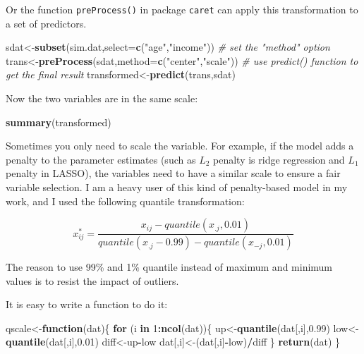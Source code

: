 \documentclass[12pt,]{krantz}
\makeatletter
\newenvironment{Shaded}{\begin{snugshade}}{\end{snugshade}}
\newcommand{\KeywordTok}[1]{\textcolor[rgb]{0.27,0.27,0.27}{\textbf{#1}}}
\newcommand{\DataTypeTok}[1]{\textcolor[rgb]{0.27,0.27,0.27}{#1}}
\newcommand{\DecValTok}[1]{\textcolor[rgb]{0.06,0.06,0.06}{#1}}
\newcommand{\FloatTok}[1]{\textcolor[rgb]{0.06,0.06,0.06}{#1}}
\newcommand{\StringTok}[1]{\textcolor[rgb]{0.5,0.5,0.5}{#1}}
\newcommand{\CommentTok}[1]{\textcolor[rgb]{0.37,0.37,0.37}{\textit{#1}}}
\newcommand{\ControlFlowTok}[1]{\textcolor[rgb]{0.27,0.27,0.27}{\textbf{#1}}}
\newcommand{\OperatorTok}[1]{\textcolor[rgb]{0.43,0.43,0.43}{\textbf{#1}}}
\newcommand{\NormalTok}[1]{#1}
\newenvironment{kframe}{%
\medskip{}
\setlength{\fboxsep}{.8em}
 \def\at@end@of@kframe{}%
 \ifinner\ifhmode%
  \def\at@end@of@kframe{\end{minipage}}%
  \begin{minipage}{\columnwidth}%
 \fi\fi%
 \def\FrameCommand##1{\hskip\@totalleftmargin \hskip-\fboxsep
 \colorbox{shadecolor}{##1}\hskip-\fboxsep
     \hskip-\linewidth \hskip-\@totalleftmargin \hskip\columnwidth}%
 \MakeFramed {\advance\hsize-\width
   \@totalleftmargin\z@ \linewidth\hsize
   \@setminipage}}%
 {\par\unskip\endMakeFramed%
 \at@end@of@kframe}
\renewenvironment{Shaded}{\begin{kframe}}{\end{kframe}}
\theoremstyle{definition}
\theoremstyle{definition}
\theoremstyle{definition}
\theoremstyle{remark}
\makeatother
\begin{document}
Or the function \texttt{preProcess()} in package \texttt{caret} can
apply this transformation to a set of predictors.

\begin{Shaded}
\begin{Highlighting}[]
\NormalTok{sdat<-}\KeywordTok{subset}\NormalTok{(sim.dat,}\DataTypeTok{select=}\KeywordTok{c}\NormalTok{(}\StringTok{"age"}\NormalTok{,}\StringTok{"income"}\NormalTok{))}
\CommentTok{# set the "method" option}
\NormalTok{trans<-}\KeywordTok{preProcess}\NormalTok{(sdat,}\DataTypeTok{method=}\KeywordTok{c}\NormalTok{(}\StringTok{"center"}\NormalTok{,}\StringTok{"scale"}\NormalTok{))}
\CommentTok{# use predict() function to get the final result}
\NormalTok{transformed<-}\KeywordTok{predict}\NormalTok{(trans,sdat)}
\end{Highlighting}
\end{Shaded}

Now the two variables are in the same scale:

\begin{Shaded}
\begin{Highlighting}[]
\KeywordTok{summary}\NormalTok{(transformed)}
\end{Highlighting}
\end{Shaded}

Sometimes you only need to scale the variable. For example, if the model
adds a penalty to the parameter estimates (such as \(L_2\) penalty is
ridge regression and \(L_1\) penalty in LASSO), the variables need to
have a similar scale to ensure a fair variable selection. I am a heavy
user of this kind of penalty-based model in my work, and I used the
following quantile transformation:

\[
x_{ij}^{*}=\frac{x_{ij}-quantile(x_{.j},0.01)}{quantile(x_{.j}-0.99)-quantile(x_{-j},0.01)}
\]

The reason to use 99\% and 1\% quantile instead of maximum and minimum
values is to resist the impact of outliers.

It is easy to write a function to do it:

\begin{Shaded}
\begin{Highlighting}[]
\NormalTok{qscale<-}\ControlFlowTok{function}\NormalTok{(dat)\{}
  \ControlFlowTok{for}\NormalTok{ (i }\ControlFlowTok{in} \DecValTok{1}\OperatorTok{:}\KeywordTok{ncol}\NormalTok{(dat))\{}
\NormalTok{    up<-}\KeywordTok{quantile}\NormalTok{(dat[,i],}\FloatTok{0.99}\NormalTok{)}
\NormalTok{    low<-}\KeywordTok{quantile}\NormalTok{(dat[,i],}\FloatTok{0.01}\NormalTok{)}
\NormalTok{    diff<-up}\OperatorTok{-}\NormalTok{low}
\NormalTok{    dat[,i]<-(dat[,i]}\OperatorTok{-}\NormalTok{low)}\OperatorTok{/}\NormalTok{diff}
\NormalTok{  \}}
  \KeywordTok{return}\NormalTok{(dat)}
\NormalTok{\}}
\end{Highlighting}
\end{Shaded}
\end{document}
